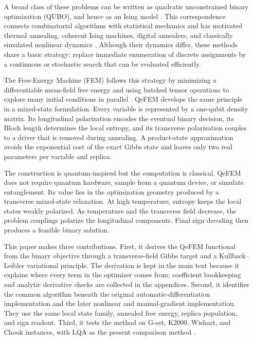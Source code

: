 \documentclass[
  aps,
  prx,
  reprint,
  amsmath,
  amssymb,
  groupedaddress,
  nofootinbib,
  floatfix,
  longbibliography
]{revtex4-2}
\newcommand{\qefem}{QeFEM}
\newcommand{\lqa}{\textsc{LQA}}
\begin{document}
A broad class of these problems can be written as quadratic unconstrained
binary optimization (QUBO), and hence as an Ising model
\cite{lucas2014}.  This correspondence connects combinatorial algorithms with
statistical mechanics and has motivated thermal annealing, coherent Ising
machines, digital annealers, and classically simulated nonlinear dynamics
\cite{kirkpatrick1983,inagaki2016science,aramon2019,goto2019sbm}.  Although
their dynamics differ, these methods share a basic strategy: replace immediate
enumeration of discrete assignments by a continuous or stochastic search that
can be evaluated efficiently.

The Free-Energy Machine (FEM) follows this strategy by minimizing a
differentiable mean-field free energy and using batched tensor operations to
explore many initial conditions in parallel \cite{shen2025}.  \qefem{}
develops the same principle in a mixed-state formulation.  Every variable is
represented by a one-qubit density matrix.  Its longitudinal polarization
encodes the eventual binary decision, its Bloch length determines the local
entropy, and its transverse polarization couples to a driver that is removed
during annealing.  A product-state approximation avoids the exponential cost
of the exact Gibbs state and leaves only two real parameters per variable and
replica.

The construction is quantum-inspired but the computation is classical.
\qefem{} does not require quantum hardware, sample from a quantum device, or
simulate entanglement.  Its value lies in the optimization geometry produced
by a transverse mixed-state relaxation.  At high temperature, entropy keeps
the local states weakly polarized.  As temperature and the transverse field decrease, the
problem couplings polarize the longitudinal components.  Final sign decoding
then produces a feasible binary solution.

This paper makes three contributions.  First, it derives the \qefem{}
functional from the binary objective through a transverse-field Gibbs target
and a Kullback--Leibler variational principle.  The derivation is kept in the
main text because it explains where every term in the optimizer comes from;
coefficient bookkeeping and analytic derivative checks are collected in the
appendices.  Second, it identifies the common algorithm beneath the original
automatic-differentiation implementation and the later nonlinear and
manual-gradient implementation.  They use the same local state family,
annealed free energy, replica population, and sign readout.  Third, it tests
the method on G-set, K2000, Wishart, and Chook instances, with \lqa{} as the
present comparison method \cite{bowles2022}.
\end{document}

